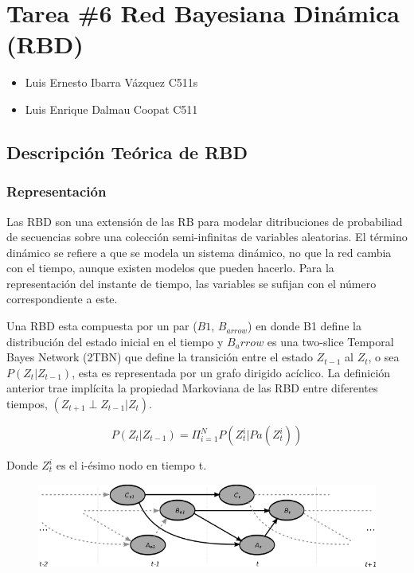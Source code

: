 \documentclass[]{article}
\date{}
\begin{document}
\section{Tarea \#6 Red Bayesiana Dinámica (RBD)}\label{header-n0}

\begin{itemize}
\item
  Luis Ernesto Ibarra Vázquez C511s
\item
  Luis Enrique Dalmau Coopat C511
\end{itemize}

\subsection{Descripción Teórica de RBD}\label{header-n7}

\subsubsection{Representación}\label{header-n8}

Las RBD son una extensión de las RB para modelar ditribuciones de
probabiliad de secuencias sobre una colección semi-infinitas de
variables aleatorias. El término dinámico se refiere a que se modela un
sistema dinámico, no que la red cambia con el tiempo, aunque existen
modelos que pueden hacerlo. Para la representación del instante de
tiempo, las variables se sufijan con el número correspondiente a este.

Una RBD esta compuesta por un par ($B1$, $B_{arrow}$) en
donde B1 define la distribución del estado inicial en el tiempo y
$B_arrow$ es una two-slice Temporal Bayes Network (2TBN) que define la
transición entre el estado $Z_{t-1}$ al $Z_t$, o sea
$P(Z_t|Z_{t-1})$, esta es representada por un grafo
dirigido acíclico. La definición anterior trae implícita la propiedad
Markoviana de las RBD entre diferentes tiempos, $(Z_{t+1} \perp Z_{t-1} | Z_{t})$.

$$P(Z_t|Z_{t-1}) = \Pi_{i=1}^{N} P(Z_t^i|Pa(Z^i_t))$$

Donde $Z_t^i$ es el i-ésimo nodo en tiempo t.

\begin{figure}
\centering
\includegraphics{images/2TSBN.png}
\caption{}
\end{figure}
\end{document}
